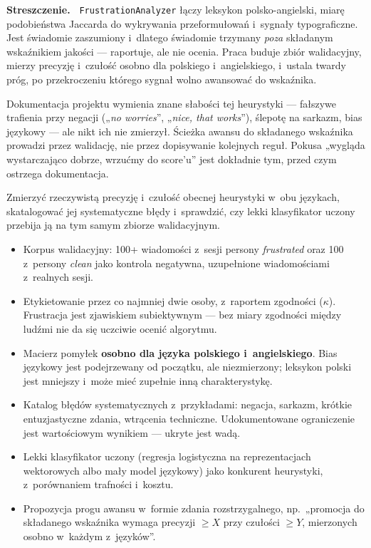 \documentclass[11pt,a4paper]{article}
\newcommand{\blok}[1]{\vspace{0.2em}\noindent{\bfseries\color{csblue}#1}\par\nopagebreak}
\newenvironment{streszczenie}%
  {\vspace{-0.7em}\begin{shaded}\noindent\textbf{Streszczenie.\ }}%
  {\end{shaded}\vspace{-0.5em}}
\begin{document}
\begin{streszczenie}
\texttt{FrustrationAnalyzer} łączy leksykon polsko-angielski, miarę podobieństwa
Jaccarda do wykrywania przeformułowań i~sygnały typograficzne. Jest świadomie
zaszumiony i~dlatego świadomie trzymany \emph{poza} składanym wskaźnikiem
jakości --- raportuje, ale nie ocenia. Praca buduje zbiór walidacyjny, mierzy
precyzję i~czułość osobno dla polskiego i~angielskiego, i~ustala twardy próg,
po przekroczeniu którego sygnał wolno awansować do wskaźnika.
\end{streszczenie}

\blok{Kontekst i motywacja}
Dokumentacja projektu wymienia znane słabości tej heurystyki --- fałszywe
trafienia przy negacji („\emph{no worries}'', „\emph{nice, that works}''),
ślepotę na sarkazm, bias językowy --- ale nikt ich nie zmierzył. Ścieżka awansu
do składanego wskaźnika prowadzi przez walidację, nie przez dopisywanie kolejnych
reguł. Pokusa „wygląda wystarczająco dobrze, wrzućmy do score'u'' jest dokładnie
tym, przed czym ostrzega dokumentacja.

\blok{Cel pracy}
Zmierzyć rzeczywistą precyzję i~czułość obecnej heurystyki w~obu językach,
skatalogować jej systematyczne błędy i~sprawdzić, czy lekki klasyfikator uczony
przebija ją na tym samym zbiorze walidacyjnym.

\blok{Zakres prac}
\begin{itemize}
  \item Korpus walidacyjny: 100+ wiadomości z~sesji persony \emph{frustrated}
        oraz 100 z~persony \emph{clean} jako kontrola negatywna, uzupełnione
        wiadomościami z~realnych sesji.
  \item Etykietowanie przez co najmniej dwie osoby, z~raportem zgodności
        ($\kappa$). Frustracja jest zjawiskiem subiektywnym --- bez miary
        zgodności między ludźmi nie da się uczciwie ocenić algorytmu.
  \item Macierz pomyłek \textbf{osobno dla języka polskiego i~angielskiego}.
        Bias językowy jest podejrzewany od początku, ale niezmierzony;
        leksykon polski jest mniejszy i~może mieć zupełnie inną charakterystykę.
  \item Katalog błędów systematycznych z~przykładami: negacja, sarkazm, krótkie
        entuzjastyczne zdania, wtrącenia techniczne. Udokumentowane ograniczenie
        jest wartościowym wynikiem --- ukryte jest wadą.
  \item Lekki klasyfikator uczony (regresja logistyczna na reprezentacjach
        wektorowych albo mały model językowy) jako konkurent heurystyki,
        z~porównaniem trafności i~kosztu.
  \item Propozycja progu awansu w~formie zdania rozstrzygalnego, np.\
        „promocja do składanego wskaźnika wymaga precyzji $\geq X$ przy czułości
        $\geq Y$, mierzonych osobno w~każdym z~języków''.
\end{itemize}
\end{document}
